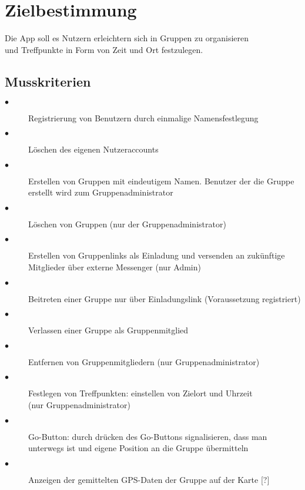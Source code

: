 \documentclass{article}
\begin{document}
\section{Zielbestimmung}
Die App soll es Nutzern erleichtern sich in Gruppen zu organisieren \\
und Treffpunkte in Form von Zeit und Ort festzulegen.
\subsection{Musskriterien}
\begin{description}
\item[$\bullet$] Registrierung von Benutzern durch einmalige Namensfestlegung
\item[$\bullet$] Löschen des eigenen Nutzeraccounts
\item[$\bullet$] Erstellen von Gruppen mit eindeutigem Namen. Benutzer der die Gruppe erstellt wird zum Gruppenadministrator
\item[$\bullet$] Löschen von Gruppen (nur der Gruppenadministrator)
\item[$\bullet$] Erstellen von Gruppenlinks als Einladung und versenden an zukünftige Mitglieder über externe Messenger (nur Admin)
\item[$\bullet$] Beitreten einer Gruppe nur über Einladungslink (Voraussetzung registriert)
\item[$\bullet$] Verlassen einer Gruppe als Gruppenmitglied
\item[$\bullet$] Entfernen von Gruppenmitgliedern (nur Gruppenadministrator)
\item[$\bullet$] Festlegen von Treffpunkten: einstellen von Zielort und Uhrzeit\\(nur Gruppenadministrator)
\item[$\bullet$] Go-Button: durch drücken des Go-Buttons signalisieren, dass man unterwegs ist und eigene Position an die Gruppe übermitteln
\item[$\bullet$] Anzeigen der gemittelten GPS-Daten der Gruppe auf der Karte [?]
\end{description}
\end{document}
